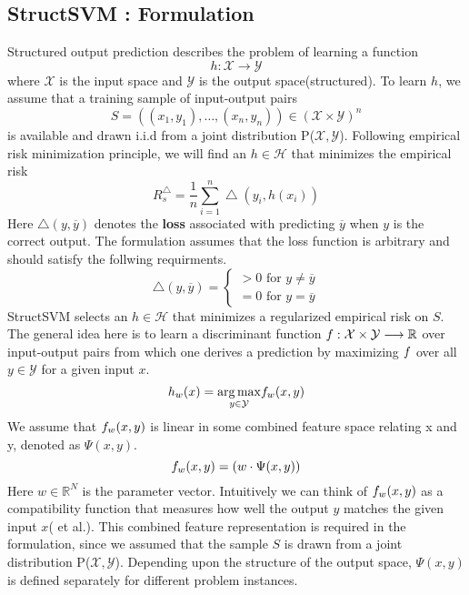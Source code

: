 \subsection{StructSVM : Formulation}
Structured output prediction describes the problem of learning a function
\[ h: \mathcal{X} \longrightarrow \mathcal{Y} \]
where $\mathcal{X}$ is the input space and $\mathcal{Y}$ is the output space(structured). To learn $h$, we assume that a training sample of input-output pairs
\[ S = ((x_1, y_1), \ldots, (x_n, y_n)) \in (\mathcal{X} \times \mathcal{Y})^n \]
is available and drawn i.i.d from a joint distribution P($\mathcal{X},\mathcal{Y}$). Following empirical risk minimization principle, we will find an $h \in \mathcal{H}$ that minimizes the empirical risk
\[ R_s^{\bigtriangleup} = \frac{1}{n} \sum_{i=1}^n \bigtriangleup(y_i, h(x_i)) \]
Here $\bigtriangleup(y, \overline{y})$ denotes the \textbf{loss} associated with predicting $\overline{y}$ when $y$ is the correct output. The formulation assumes that the loss function is arbitrary and should satisfy the follwing requirments. 
\begin{equation*}
\bigtriangleup(y, \overline{y}) = 
\begin{cases}
 > 0 \textrm{ for } y \neq \overline{y} \\
 = 0 \textrm{ for } y = \overline{y}
 \end{cases}
\end{equation*}
StructSVM selects an $h \in \mathcal{H}$ that minimizes a regularized empirical risk on $S$. The general idea here is to learn a discriminant function $\mathnormal{f} : \mathcal{X} \times \mathcal{Y} \longrightarrow \mathbb{R}$ over input-output pairs from which one derives a prediction by maximizing $\mathnormal{f}$ over all $y \in \mathcal{Y}$ for a given input $x$.
\[ h_w(x) =  \underset{y \in \mathcal{Y}}{\arg\max} \mathnormal{f}_w(x,y) \]
We assume that $\mathnormal{f}_w(x,y)$ is linear in some combined feature space relating x and y, denoted as $\Psi(x,y)$.
\[ \mathnormal{f}_w(x,y) = (w \cdot \Psi(x,y)) \]
Here $w \in \mathbb{R}^N$ is the parameter vector. Intuitively we can think of $\mathnormal{f}_w(x,y)$ as a compatibility function that measures how well the output $y$ matches the given input $x$(\cite{joachims_cutting} et al.). This combined feature representation is required in the formulation, since we assumed that the sample $S$ is drawn from a joint distribution P($\mathcal{X},\mathcal{Y}$). Depending upon the structure of the output space, $\Psi(x,y)$ is defined separately for different problem instances.

